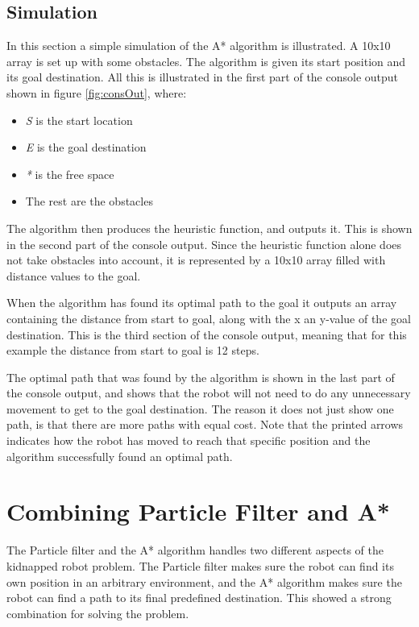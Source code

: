 \subsection{Simulation}
In this section a simple simulation of the A* algorithm is illustrated. A 10x10 array is set up with some obstacles. The algorithm is given its start position and its goal destination. All this is illustrated in the first part of the console output shown in figure \ref{fig:consOut}, where:

\begin{itemize}
	\item \emph{S} is the start location
	\item \emph{E} is the goal destination
	\item \emph{*} is the free space
	\item The rest are the obstacles
\end{itemize}

The algorithm then produces the heuristic function, and outputs it. This is shown in the second part of the console output. Since the heuristic function alone does not take obstacles into account, it is represented by a 10x10 array filled with distance values to the goal. 

When the algorithm has found its optimal path to the goal it outputs an array containing the distance from start to goal, along with the x an y-value of the goal destination. This is the third section of the console output, meaning that for this example the distance from start to goal is 12 steps. 

The optimal path that was found by the algorithm is shown in the last part of the console output, and shows that the robot will not need to do any unnecessary movement to get to the goal destination. The reason it does not just show one path, is that there are more paths with equal cost. Note that the printed arrows indicates how the robot has moved to reach that specific position and the algorithm successfully found an optimal path.


\section{Combining Particle Filter and A*}

The Particle filter and the A* algorithm handles two different aspects of the kidnapped robot problem. The Particle filter makes sure the robot can find its own position in an arbitrary environment, and the A* algorithm makes sure the robot can find a path to its final predefined destination. This showed a strong combination for solving the problem.

